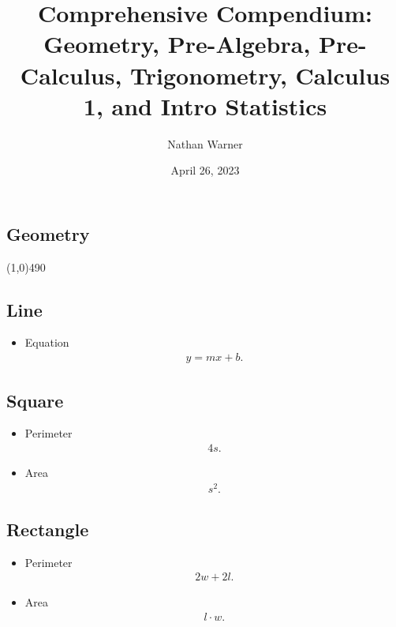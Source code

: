 \documentclass{report}
\title{\Huge{Comprehensive Compendium: Geometry, Pre-Algebra, Pre-Calculus, Trigonometry, Calculus 1, and Intro Statistics}}
\author{\huge{Nathan Warner}}
\date{\huge{April 26, 2023}}
\begin{document}
    \maketitle
    \tableofcontents
    \pagebreak \bigbreak \noindent

    \bigbreak \noindent 
    \begin{center}
      \section{Geometry}
    \end{center}
    \line(1,0){490}
    \bigbreak \noindent \bigbreak \noindent 
    \subsection{Line}
    \begin{itemize}
      \item Equation
        \begin{align*}
          y=mx+b
        .\end{align*}
    \end{itemize}
    \bigbreak \noindent \bigbreak \noindent 
    \subsection{Square}
    \begin{itemize}
      \item Perimeter
        \begin{align*}
          4s
        .\end{align*}
      \item Area
        \begin{align*}
          s^{2}
        .\end{align*}
    \end{itemize}

    \bigbreak \noindent \bigbreak \noindent 
    \subsection{Rectangle}
    \begin{itemize}
      \item Perimeter
        \begin{align*}
          2w + 2l
        .\end{align*}
      \item Area
        \begin{align*}
          l \cdot w
        .\end{align*}
    \end{itemize}
\end{document}
